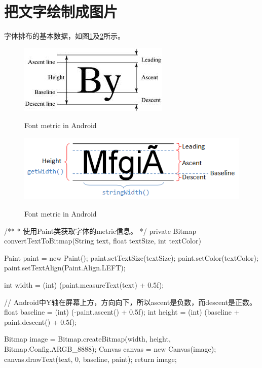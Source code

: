 \section[Draw text as picture]{把文字绘制成图片}
字体排布的基本数据，如图\ref{fig:android_font_metric}及\ref{fig:android_font_metric_2}所示。

\begin{figure}
  \centering
  \includegraphics[width=.3\textwidth]{picturedir/font_metric.png}\\
  \caption{Font metric in Android}\label{fig:android_font_metric}
\end{figure}

\begin{figure}
  \centering
  \includegraphics[width=.6\textwidth]{picturedir/font_metric_2.png}\\
  \caption{Font metric in Android}\label{fig:android_font_metric_2}
\end{figure}

\begin{javacode}
/**
 *  使用Paint类获取字体的metric信息。
 */
private Bitmap convertTextToBitmap(String text, float textSize, int textColor) {
  Paint paint = new Paint();
  paint.setTextSize(textSize);
  paint.setColor(textColor);
  paint.setTextAlign(Paint.Align.LEFT);
  
  int width = (int) (paint.measureText(text) + 0.5f);
  
  // Android中Y轴在屏幕上方，方向向下，所以ascent是负数，而descent是正数。
  float baseline = (int) (-paint.ascent() + 0.5f);
  int height = (int) (baseline + paint.descent() + 0.5f);
  
  Bitmap image = Bitmap.createBitmap(width, height, Bitmap.Config.ARGB_8888);
  Canvas canvas = new Canvas(image);
  canvas.drawText(text, 0, baseline, paint);
  return image;
}
\end{javacode}